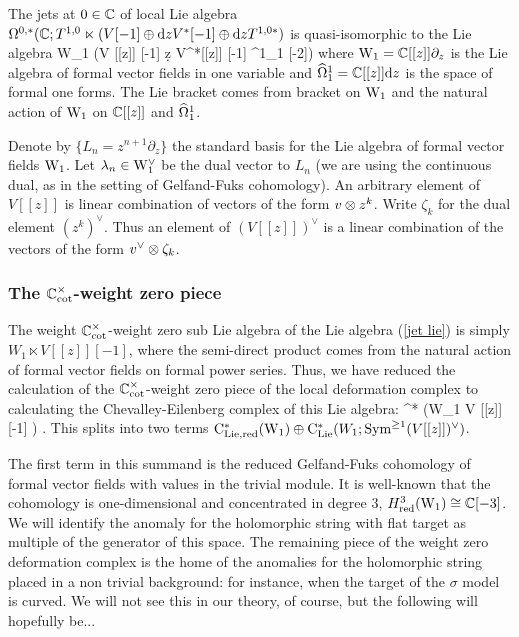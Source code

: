 The jets at $0 \in \mathbb C$ of local Lie algebra $\Omega^{0,*}(\mathbb C ; T^{1,0} \ltimes (V[-1] \oplus {\rm d} z V^*[-1] \oplus {\rm d} z T^{1,0 *})$ is quasi-isomorphic to the Lie algebra
\be\label{jet lie}
{\rm W}_1 \ltimes (V [[z]] [-1] \oplus \d z V^*[[z]] [-1] \oplus \hOmega^1_1 [-2])
\ee
where ${\rm W}_1 = \mathbb C [[z]] \partial_z$ is the Lie algebra of formal vector fields in one variable and $\widehat{\Omega}^1_1 = \mathbb C [[z]] {\rm d} z$ is the space of formal one forms. 
The Lie bracket comes from bracket on ${\rm W}_1$ and the natural action of ${\rm W}_1$ on $\mathbb C [[z]]$ and $\widehat{\Omega}^1_1$. 

Denote by $\{L_n = z^{n+1} \partial_z\}$ the standard basis for the Lie algebra of formal vector fields ${\rm W}_1$. 
Let $\lambda_n \in {\rm W}_1^\vee$ be the dual vector to $L_n$ (we are using the continuous dual, as in the setting of Gelfand-Fuks cohomology). 
An arbitrary element of $V [[z]]$ is linear combination of vectors of the form $v \otimes z^k$. 
Write $\zeta_k$ for the dual element $(z^k)^\vee$. 
Thus an element of $(V [[z]])^\vee$ is a linear combination of the vectors of the form $v^\vee \otimes \zeta_k$. 

\subsubsection{The $\mathbb C^\times_{\rm cot}$-weight zero piece}

The weight $\mathbb C^\times_{\rm cot}$-weight zero sub Lie algebra of the Lie algebra (\ref{jet lie}) is simply $W_1 \ltimes V [[z]] [-1]$, where the semi-direct product comes from the natural action of formal vector fields on formal power series.
Thus, we have reduced the calculation of the $\mathbb C^\times_{\rm cot}$-weight zero piece of the local deformation complex to calculating the Chevalley-Eilenberg complex of this Lie algebra:
\ben
\cred^* \left({\rm W}_1 \ltimes V [[z]] [-1] \right) .
\een
This splits into two terms ${\rm C}_{\rm Lie,red}^* ({\rm W}_1) \oplus {\rm C}_{{\rm Lie}}^*(W_1 ;  {\rm Sym}^{\geq 1} (V [[z]])^\vee)$. 

The first term in this summand is the reduced Gelfand-Fuks cohomology of formal vector fields with values in the trivial module.
It is well-known that the cohomology is one-dimensional and concentrated in degree $3$, $H^3_{\rm red} ({\rm W}_1) \cong \mathbb C[-3]$. 
We will identify the anomaly for the holomorphic string with flat target as multiple of the generator of this space. 
The remaining piece of the weight zero deformation complex is the home of the anomalies for the holomorphic string placed in a non trivial background: for instance, when the target of the $\sigma$ model is curved. 
We will not see this in our theory, of course, but the following will hopefully be...

